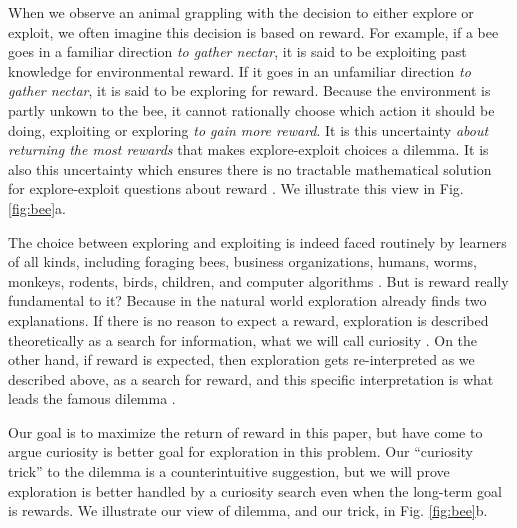 When we observe an animal grappling with the decision to either explore or exploit, we often imagine this decision is based on reward. For example, if a bee goes in a familiar direction \textit{to gather nectar}, it is said to be exploiting past knowledge for environmental reward. If it goes in an unfamiliar direction \textit{to gather nectar}, it is said to be exploring for reward. Because the environment is partly unkown to the bee, it cannot rationally choose which action it should be doing, exploiting or exploring \textit{to gain more reward}. It is this uncertainty \textit{about returning the most rewards} that makes explore-exploit choices a dilemma. It is also this uncertainty which ensures there is no tractable mathematical solution for explore-exploit questions about reward \citep{Thrun1992a,Dayan1996,Ishii2002,Simsek2006,Gershman2018b}. We illustrate this view in Fig. \ref{fig:bee}a.

The choice between exploring and exploiting is indeed faced routinely by learners of all kinds, including foraging bees, business organizations, humans, worms, monkeys, rodents, birds, children, and computer algorithms \citep{Gupta2006,Sutton2018,Woodgate2017,Lee2011a,Schulz2018a,Calhoun2014,Wang2019,Sumner2019,Auersperg2015}. But is reward really fundamental to it? Because in the natural world exploration already finds two explanations. If there is no reason to expect a reward, exploration is described theoretically as a search for information, what we will call curiosity \citep{Berlyne1950,Schmidhuber1991,Kidd2015,deAbril2018,Jaegle2019,Friston2016}. On the other hand, if reward is expected, then exploration gets re-interpreted as we described above, as a search for reward, and this specific interpretation is what leads the famous dilemma \citep{Kelly1956,Berger-Tal2014,Dayan1996,Thrun1992,Mehlhorn2015,Kobayashi2019}. 

Our goal is to maximize the return of reward in this paper, but have come to argue curiosity is better goal for exploration in this problem. Our ``curiosity trick'' to the dilemma is a counterintuitive suggestion, but we will prove exploration is better handled by a curiosity search even when the long-term goal is rewards. We illustrate our view of dilemma, and our trick, in Fig. \ref{fig:bee}b.

